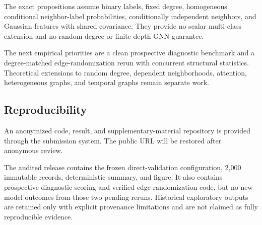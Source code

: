 The exact propositions assume binary labels, fixed degree, homogeneous conditional neighbor-label probabilities, conditionally independent neighbors, and Gaussian features with shared covariance. They provide no scalar multi-class extension and no random-degree or finite-depth GNN guarantee.

The next empirical priorities are a clean prospective diagnostic benchmark and a degree-matched edge-randomization rerun with concurrent structural statistics. Theoretical extensions to random degree, dependent neighborhoods, attention, heterogeneous graphs, and temporal graphs remain separate work.

\subsection{Reproducibility}

\balance

An anonymized code, result, and supplementary-material repository is provided through the submission system. The public URL will be restored after anonymous review.

The audited release contains the frozen direct-validation configuration, 2,000 immutable records, deterministic summary, and figure. It also contains prospective diagnostic scoring and verified edge-randomization code, but no new model outcomes from those two pending reruns. Historical exploratory outputs are retained only with explicit provenance limitations and are not claimed as fully reproducible evidence.
